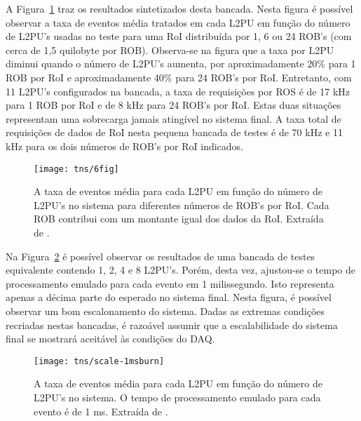 A Figura~\ref{fig:tns-6fig} traz os resultados sintetizados desta
bancada. Nesta figura é possível observar a taxa de eventos média tratados em
cada L2PU em função do número de L2PU's usadas no teste para uma RoI
distribuída por 1, 6 ou 24 ROB's (com cerca de 1,5 quilobyte por
ROB). Observa-se na figura que a taxa por L2PU diminui quando o número de
L2PU's aumenta, por aproximadamente 20\% para 1 ROB por RoI e aproximadamente
40\% para 24 ROB's por RoI. Entretanto, com 11 L2PU's configurados na bancada,
a taxa de requisições por ROS é de 17 kHz para 1 ROB por RoI e de 8 kHz para
24 ROB's por RoI. Estas duas situações representam uma sobrecarga jamais
atingível no sistema final. A taxa total de requisições de dados de RoI nesta
pequena bancada de testes é de 70 kHz e 11 kHz para os dois números de ROB's
por RoI indicados.

\begin{figure}
\begin{center}
\texttt{[image: tns/6fig]}
\end{center}
\caption{A taxa de eventos média para cada L2PU em função do número de
L2PU's no sistema para diferentes números de ROB's por RoI. Cada ROB contribui
com um montante igual dos dados da RoI. Extraída de
\cite{aa:tns-2004}.}
\label{fig:tns-6fig}
\end{figure}

Na Figura~\ref{fig:tns-scale-burn} é possível observar os resultados de uma
bancada de testes equivalente contendo 1, 2, 4 e 8 L2PU's. Porém, desta vez,
ajustou-se o tempo de processamento emulado para cada evento em 1
milissegundo. Isto representa apenas a décima parte do esperado no sistema
final. Nesta figura, é possível observar um bom escalonamento do
sistema. Dadas as extremas condições recriadas nestas bancadas, é razoável
assumir que a escalabilidade do sistema final se mostrará aceitável às
condições do DAQ.

\begin{figure}
\begin{center}
\texttt{[image: tns/scale-1msburn]}
\end{center}
\caption{A taxa de eventos média para cada L2PU em função do número de L2PU's
no sistema. O tempo de processamento emulado para cada evento é de 1
ms. Extraída de \cite{aa:tns-2004}.}
\label{fig:tns-scale-burn} 
\end{figure}

